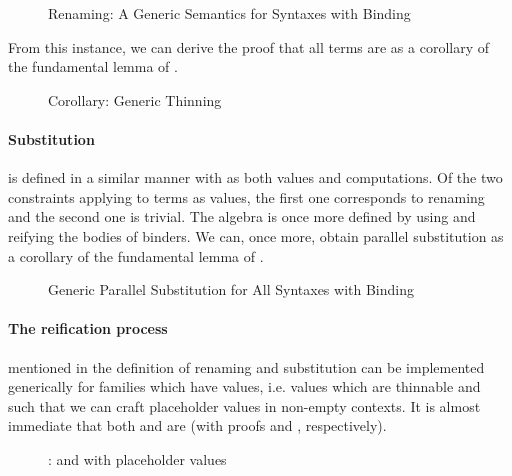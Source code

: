 \begin{figure}[h]
\caption{Renaming: A Generic Semantics for Syntaxes with Binding\label{fig:genrensem}}
\end{figure}

From this instance, we can derive the proof that all terms are  as
a corollary of the fundamental lemma of .

\begin{figure}[h]
\caption{Corollary: Generic Thinning\label{fig:genren}}
\end{figure}

\paragraph{Substitution} is defined in a similar manner with 
as both values and computations. Of the two constraints applying to
terms as values, the first one corresponds to renaming and the second
one is trivial. The algebra is once more defined by using  and
reifying the bodies of binders. We can, once more, obtain parallel
substitution as a corollary of the fundamental lemma of .

\begin{figure}[h]
\caption{Generic Parallel Substitution for All Syntaxes with Binding\label{fig:gensub}}
\end{figure}

\paragraph{The reification process} mentioned in the definition of renaming
and substitution can be implemented generically for \semrec{} families
which have  values, i.e.  values which are thinnable and
such that we can craft placeholder values in non-empty contexts. It is
almost immediate that both  and  are  (with
proofs  and ,
respectively).

\begin{figure}[h]
\caption{:  and with placeholder values\label{fig:VarLike}}
\end{figure}

